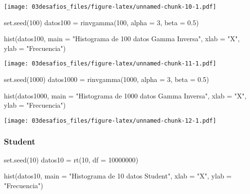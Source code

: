 \documentclass[
]{article}
\newenvironment{Shaded}{\begin{snugshade}}{\end{snugshade}}
\newcommand{\AttributeTok}[1]{\textcolor[rgb]{0.77,0.63,0.00}{#1}}
\newcommand{\DecValTok}[1]{\textcolor[rgb]{0.00,0.00,0.81}{#1}}
\newcommand{\FloatTok}[1]{\textcolor[rgb]{0.00,0.00,0.81}{#1}}
\newcommand{\FunctionTok}[1]{\textcolor[rgb]{0.00,0.00,0.00}{#1}}
\newcommand{\NormalTok}[1]{#1}
\newcommand{\OtherTok}[1]{\textcolor[rgb]{0.56,0.35,0.01}{#1}}
\newcommand{\StringTok}[1]{\textcolor[rgb]{0.31,0.60,0.02}{#1}}
\begin{document}
\texttt{[image: 03desafios\_files/figure-latex/unnamed-chunk-10-1.pdf]}

\begin{Shaded}
\begin{Highlighting}[]
\FunctionTok{set.seed}\NormalTok{(}\DecValTok{100}\NormalTok{)}
\NormalTok{datos100 }\OtherTok{=} \FunctionTok{rinvgamma}\NormalTok{(}\DecValTok{100}\NormalTok{, }\AttributeTok{alpha =} \DecValTok{3}\NormalTok{, }\AttributeTok{beta =} \FloatTok{0.5}\NormalTok{)}

\FunctionTok{hist}\NormalTok{(datos100, }\AttributeTok{main =} \StringTok{"Histograma de 100 datos Gamma Inversa"}\NormalTok{, }\AttributeTok{xlab =} \StringTok{"X"}\NormalTok{, }\AttributeTok{ylab =} \StringTok{"Frecuencia"}\NormalTok{)}
\end{Highlighting}
\end{Shaded}

\texttt{[image: 03desafios\_files/figure-latex/unnamed-chunk-11-1.pdf]}

\begin{Shaded}
\begin{Highlighting}[]
\FunctionTok{set.seed}\NormalTok{(}\DecValTok{1000}\NormalTok{)}
\NormalTok{datos1000 }\OtherTok{=} \FunctionTok{rinvgamma}\NormalTok{(}\DecValTok{1000}\NormalTok{, }\AttributeTok{alpha =} \DecValTok{3}\NormalTok{, }\AttributeTok{beta =} \FloatTok{0.5}\NormalTok{)}

\FunctionTok{hist}\NormalTok{(datos1000, }\AttributeTok{main =} \StringTok{"Histograma de 1000 datos Gamma Inversa"}\NormalTok{, }\AttributeTok{xlab =} \StringTok{"X"}\NormalTok{, }\AttributeTok{ylab =} \StringTok{"Frecuencia"}\NormalTok{)}
\end{Highlighting}
\end{Shaded}

\texttt{[image: 03desafios\_files/figure-latex/unnamed-chunk-12-1.pdf]}

\hypertarget{student-2}{%
\subsubsection{Student}\label{student-2}}

\begin{Shaded}
\begin{Highlighting}[]
\FunctionTok{set.seed}\NormalTok{(}\DecValTok{10}\NormalTok{)}
\NormalTok{datos10 }\OtherTok{=} \FunctionTok{rt}\NormalTok{(}\DecValTok{10}\NormalTok{, }\AttributeTok{df =} \DecValTok{10000000}\NormalTok{)}

\FunctionTok{hist}\NormalTok{(datos10, }\AttributeTok{main =} \StringTok{"Histograma de 10 datos Student"}\NormalTok{, }\AttributeTok{xlab =} \StringTok{"X"}\NormalTok{, }\AttributeTok{ylab =} \StringTok{"Frecuencia"}\NormalTok{)}
\end{Highlighting}
\end{Shaded}
\end{document}
